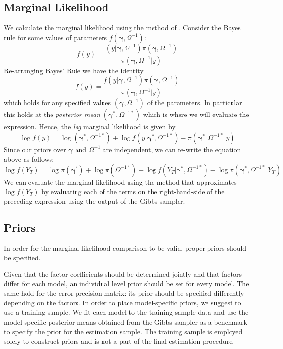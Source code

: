 \subsection{Marginal Likelihood}
 We calculate the marginal likelihood using the method of \cite{chib1995marginal}. Consider the Bayes rule for some values of parameters $f(\boldsymbol{\gamma},\Omega^{-1})$:
 \begin{equation*}
 f(y) = \frac{(y|\boldsymbol{\gamma},\Omega^{-1})\pi\left(\boldsymbol{\gamma}, \Omega^{-1}\right)}{\pi\left(\boldsymbol{\gamma}, \Omega^{-1}|y \right)}
 \end{equation*} 
Re-arranging Bayes' Rule we have the identity
\begin{equation*}
f(y) = \frac{f(y|\boldsymbol{\gamma},\Omega^{-1})\pi\left(\boldsymbol{\gamma}, \Omega^{-1}\right)}{\pi\left(\boldsymbol{\gamma}, \Omega^{-1}|y \right)}
\end{equation*}
which holds for any specified values $(\boldsymbol{\gamma},\Omega^{-1})$ of the parameters.
In particular this holds at the \emph{posterior mean} $(\boldsymbol{\gamma}^*,\Omega^{-1*})$ which is where we will evaluate the expression.
Hence, the \emph{log} marginal likelihood is given by
\begin{equation*}
\log{f(y)} =  \log \left(\boldsymbol{\gamma}^*, \Omega^{-1*}\right) + \log{f(y|\boldsymbol{\gamma}^*,\Omega^{-1*})} - \pi\left(\boldsymbol{\gamma}^*, \Omega^{-1*}|y \right)
\end{equation*}
Since our priors over $\boldsymbol{\gamma}$ and $\Omega^{-1}$ are independent, we can re-write the equation above as follows:
\begin{equation*}
\log f(Y_T) = \log \pi(\boldsymbol{\gamma}^*) + \log \pi\left( \Omega^{-1*} \right) + \log f\left( Y_T|\boldsymbol{\gamma}^*, \Omega^{-1*} \right) - \log \pi\left( \boldsymbol{\gamma}^*, \Omega^{-1*}|Y_T \right)
\end{equation*}
We can evaluate the marginal likelihood using the \cite{chib1995marginal} method that approximates $\log f(Y_T)$ by evaluating each of the terms on the right-hand-side of the preceding expression using the output of the Gibbs sampler.

\subsection{Priors}
In order for the marginal likelihood comparison to be valid, proper priors should be specified. 

Given that the factor coefficients should be determined jointly and that factors differ for each model, an individual level prior should be set for every model.
The same hold for the error precision matrix: its prior should be specified differently depending on the factors.   
In order to place model-specific priors, we suggest to use a training sample.
We fit each model to the training sample data and use the model-specific posterior means obtained from the Gibbs sampler as a benchmark to specify the prior for the estimation sample. 
The training sample is employed solely to construct priors and is not a part of the final estimation procedure. 

